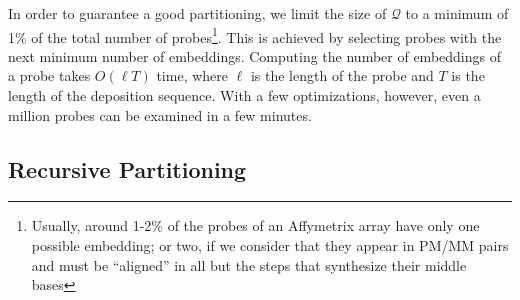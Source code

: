 \documentclass{llncs}
\begin{document}
In order to guarantee a good partitioning, we limit the size of $\mathcal{Q}$
to a minimum of 1\% of the total number of probes\footnote{Usually, around
  1-2\% of the probes of an Affymetrix array have only one possible embedding;
  or two, if we consider that they appear in PM/MM pairs and must be
  ``aligned'' in all but the steps that synthesize their middle bases}. This
is achieved by selecting probes with the next minimum number of embeddings.
Computing the number of embeddings of a probe takes $O(\ell T)$ time, where
$\ell$ is the length of the probe and $T$ is the length of the deposition
sequence.  With a few optimizations, however, even a million probes can be
examined in a few minutes.

\subsection{Recursive Partitioning}
\end{document}
